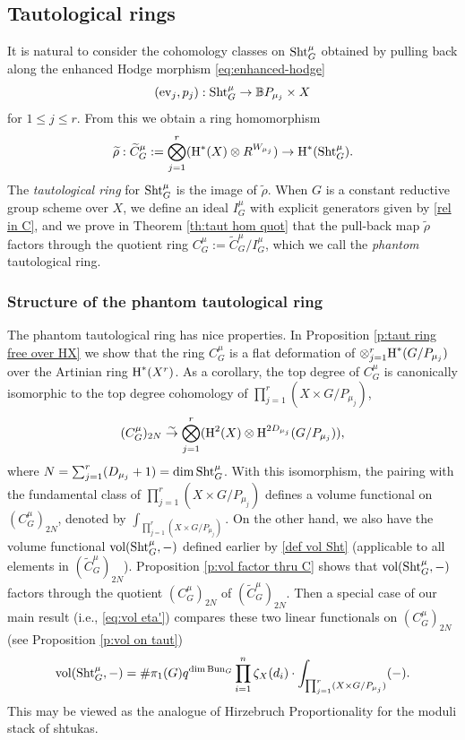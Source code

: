 \documentclass[reqno]{amsart}
\numberwithin{equation}{subsection}
\theoremstyle{definition}
\def\BB{\mathbb{B}}
\newcommand{\Bun}{\textup{Bun}}
\newcommand\ev{\textup{ev}}
\newcommand\Sht{\textup{Sht}}
\newcommand{\vol}{\textup{vol}}
\newcommand{\wt}[1]{\widetilde{#1}}
\newcommand\ot{\otimes}
\newcommand{\cohog}[2]{\textup{H}^{#1}({#2})}     %
\newcommand{\isom}{\stackrel{\sim}{\to}}
\newcommand{\z}{\zeta}
\begin{document}
\subsection{Tautological rings}
It is natural to consider the cohomology classes on $\Sht^\mu_G$ obtained by pulling back along the enhanced Hodge morphism \eqref{eq:enhanced-hodge}
\begin{equation*}
  (\ev_{j},  p_j): \Sht^\mu_G\to \BB P_{\mu_j} \times X
\end{equation*}
 for $1\le j\le r$. From this we obtain a ring homomorphism
\begin{equation*}
    \wt\rho:\wt C^\mu_G:=\bigotimes_{j=1}^r(\cohog{*}{X}\ot R^{W_{\mu_j}})\to \cohog{*}{\Sht^\mu_G}.
\end{equation*}
The {\em tautological ring} for $\Sht^\mu_G$ is the image of $\wt\rho$. When $G$ is a constant reductive group scheme over $X$, we define an ideal $I_G^\mu$ with explicit generators given by \eqref{rel in C}, and we prove in Theorem \ref{th:taut hom quot} that the pull-back map $\wt\rho$ factors through the quotient ring $C^\mu_G:=\wt C^\mu_G/I_G^\mu$, which we call the {\em phantom} tautological ring.   

\subsubsection{Structure of the phantom tautological ring}
The phantom tautological ring has nice properties. In Proposition \ref{p:taut ring free over HX} we show that the ring $C^\mu_G$ is a flat deformation of $\otimes_{j=1}^r \cohog{*}{G/P_{\mu_j}}$ over the Artinian ring $\cohog{*}{X^r}$. As a corollary, the top degree of $C^\mu_G$ is canonically isomorphic to the top degree cohomology of $\prod_{j=1}^r (X\times G/P_{\mu_j})$,
 $$
(C^\mu_G)_{2N}\isom \bigotimes_{j=1}^r(\cohog{2}{X}\ot \cohog{2D_{\mu_j}}{G/P_{\mu_j}}),
$$
where $N=\sum_{j=1}^{r}(D_{\mu_j}+1)=\dim \Sht^\mu_G$.
With this isomorphism, the pairing with the fundamental class of $\prod_{j=1}^r (X\times G/P_{\mu_j})$ defines a volume functional on $(C^\mu_G)_{2N}$, denoted by $\int_{\prod_{j=1}^r (X\times G/P_{\mu_j})}$. 
On the other hand, we also have the volume functional  $\vol(\Sht_G^\mu, -)$ defined earlier by \eqref{def vol Sht} (applicable to all elements in $(\wt C^\mu_G)_{2N}$). Proposition \ref{p:vol factor thru C} shows that  $\vol(\Sht_G^\mu, -)$  factors through the quotient $(C^\mu_G)_{2N}$ of $(\wt C^\mu_G)_{2N}$.
Then a special case of our main result (i.e., \eqref{eq:vol eta'}) compares these two linear functionals on $(C^\mu_G)_{2N}$ (see Proposition \ref{p:vol on taut}) 
    \begin{equation*}
        \vol(\Sht_G^\mu, -) =\# \pi_1(G) q^{\dim \Bun_G}\prod_{i=1}^n\z_X(d_i)\cdot \int_{\prod_{j=1}^r (X\times G/P_{\mu_j})}(-).
    \end{equation*}
     This may be viewed as the analogue of Hirzebruch Proportionality for the moduli stack of shtukas. 
     
\end{document}
